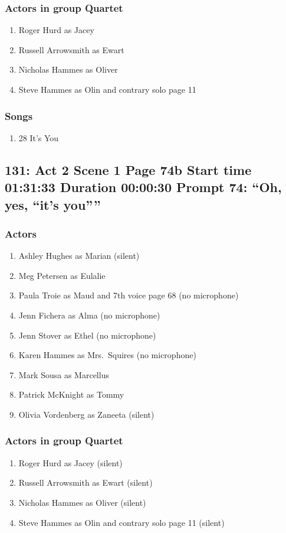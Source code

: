 \subsubsection{Actors in group Quartet}
\begin{enumerate}
\item Roger Hurd as Jacey
\item Russell Arrowsmith as Ewart
\item Nicholas Hammes as Oliver
\item Steve Hammes as Olin and contrary solo page 11
\end{enumerate}

\subsubsection{Songs}
\begin{enumerate}
\item 28 It's You
\end{enumerate}
\subsection{131: Act 2 Scene 1 Page 74b Start time 01:31:33 Duration 00:00:30 Prompt 74: ``Oh, yes, ``it's you''''}

\subsubsection{Actors}
\begin{enumerate}
\item Ashley Hughes as Marian (silent)
\item Meg Petersen as Eulalie
\item Paula Troie as Maud and 7th voice page 68 (no microphone)
\item Jenn Fichera as Alma (no microphone)
\item Jenn Stover as Ethel (no microphone)
\item Karen Hammes as Mrs.~Squires (no microphone)
\item Mark Sousa as Marcellus
\item Patrick McKnight as Tommy
\item Olivia Vordenberg as Zaneeta (silent)
\end{enumerate}
\subsubsection{Actors in group Quartet}
\begin{enumerate}
\item Roger Hurd as Jacey (silent)
\item Russell Arrowsmith as Ewart (silent)
\item Nicholas Hammes as Oliver (silent)
\item Steve Hammes as Olin and contrary solo page 11 (silent)
\end{enumerate}
